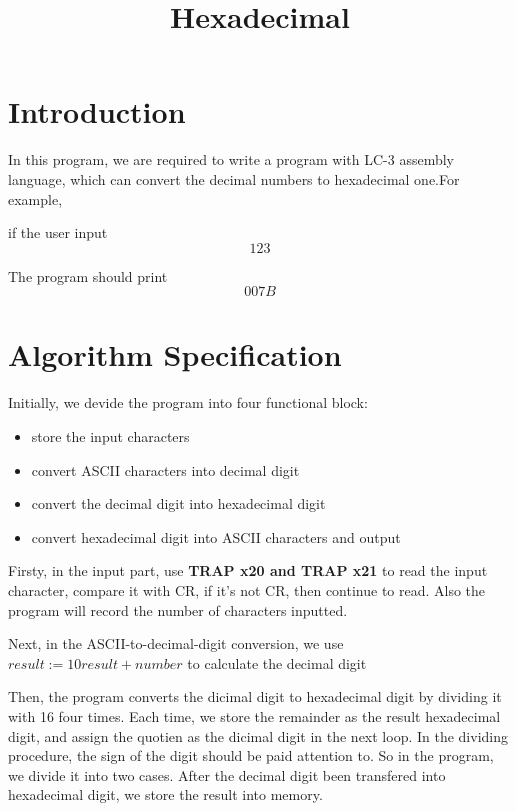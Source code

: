 \documentclass[twoside]{article}
\begin{document}
\begin{CJK*}{UTF8}{gbsn}
	\title{Hexadecimal}
	\date{}

	\section{Introduction}

	In this program, we are required to write a program with LC-3 assembly language, which can convert the decimal numbers to hexadecimal one.For example, 
	
	if the user input$$123$$
	
	The program should print  $$007B$$
	

	\section{Algorithm Specification}
	Initially, we devide the program into four functional block:
	\begin{itemize}
		\item store the input characters
		\item convert ASCII characters into decimal digit
		\item convert the decimal digit into hexadecimal digit
		\item convert hexadecimal digit into ASCII characters and output
	\end{itemize}
	
	Firsty, in the input part, use \textbf{TRAP x20 and TRAP x21} to read the input character, compare it with CR, if it's not CR, then continue to read. Also the program will record the number of characters inputted.
	
	Next, in the ASCII-to-decimal-digit conversion, we use $result:= 10result + number$	to calculate the decimal digit
	
	Then, the program converts the dicimal digit to hexadecimal digit by dividing it with 16 four times. Each time, we store the remainder as the result hexadecimal digit, and assign the quotien as the dicimal digit in the next loop. In the dividing procedure, the sign of the digit should be paid attention to. So in the program, we divide it into two cases. After the decimal digit been transfered into hexadecimal digit, we store the result into memory.
	

\end{CJK*}
\end{document}
